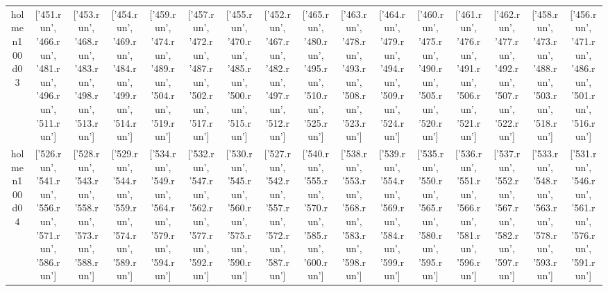 \documentclass[landscape, 12pt]{report}
\begin{document}
\begin{tabular}{|c|c|c|c|c|c|c|c|c|c|c|c|c|c|c|c|}
\\
holmen100d03 & ['451.run', '466.run', '481.run', '496.run', '511.run'] & ['453.run', '468.run', '483.run', '498.run', '513.run'] & ['454.run', '469.run', '484.run', '499.run', '514.run'] & ['459.run', '474.run', '489.run', '504.run', '519.run'] & ['457.run', '472.run', '487.run', '502.run', '517.run'] & ['455.run', '470.run', '485.run', '500.run', '515.run'] & ['452.run', '467.run', '482.run', '497.run', '512.run'] & ['465.run', '480.run', '495.run', '510.run', '525.run'] & ['463.run', '478.run', '493.run', '508.run', '523.run'] & ['464.run', '479.run', '494.run', '509.run', '524.run'] & ['460.run', '475.run', '490.run', '505.run', '520.run'] & ['461.run', '476.run', '491.run', '506.run', '521.run'] & ['462.run', '477.run', '492.run', '507.run', '522.run'] & ['458.run', '473.run', '488.run', '503.run', '518.run'] & ['456.run', '471.run', '486.run', '501.run', '516.run']
\\
holmen100d04 & ['526.run', '541.run', '556.run', '571.run', '586.run'] & ['528.run', '543.run', '558.run', '573.run', '588.run'] & ['529.run', '544.run', '559.run', '574.run', '589.run'] & ['534.run', '549.run', '564.run', '579.run', '594.run'] & ['532.run', '547.run', '562.run', '577.run', '592.run'] & ['530.run', '545.run', '560.run', '575.run', '590.run'] & ['527.run', '542.run', '557.run', '572.run', '587.run'] & ['540.run', '555.run', '570.run', '585.run', '600.run'] & ['538.run', '553.run', '568.run', '583.run', '598.run'] & ['539.run', '554.run', '569.run', '584.run', '599.run'] & ['535.run', '550.run', '565.run', '580.run', '595.run'] & ['536.run', '551.run', '566.run', '581.run', '596.run'] & ['537.run', '552.run', '567.run', '582.run', '597.run'] & ['533.run', '548.run', '563.run', '578.run', '593.run'] & ['531.run', '546.run', '561.run', '576.run', '591.run']
\\
\hline 
 \end{tabular}
\end{document}
